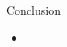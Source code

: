 % 
% 
% 
% 
% 
% 
% 
% 
% 
% 
% 
% 
% 


\begin{frame}{Conclusion}

\begin{itemize}
 \item 
\end{itemize}

 
\end{frame}


